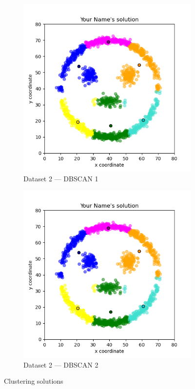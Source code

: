 \documentclass[10pt,a4paper]{article}
\begin{document}
\begin{figure}[htb]
\begin{subfigure}[b]{0.3\textwidth}
	    \includegraphics[width=\textwidth]{clustering_solution.png} %
	    \caption{Dataset 2 --- DBSCAN 1}
	    \label{fig:dbscan4}
	\end{subfigure}
	\begin{subfigure}[b]{0.3\textwidth}
	    \includegraphics[width=\textwidth]{clustering_solution.png} %
	    \caption{Dataset 2 --- DBSCAN 2}
	    \label{fig:dbscan7}
	\end{subfigure}
	\caption{Clustering solutions}
	\label{fig:solution}
\end{figure}
\end{document}
